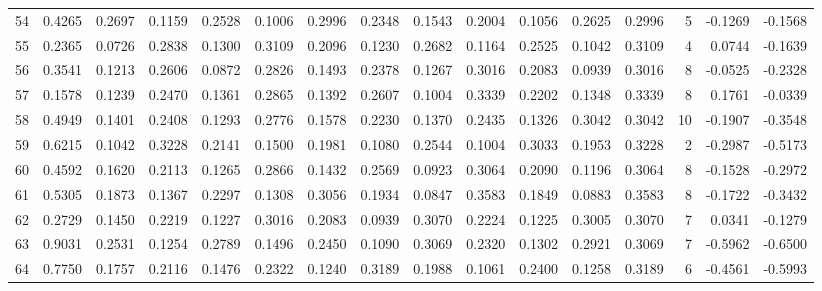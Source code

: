 \begin{tabular}{lrrrrrrrrrrrrrrr}
54  &      0.4265 &  0.2697 &  0.1159 &  0.2528 &  0.1006 &  0.2996 &  0.2348 &  0.1543 &  0.2004 &  0.1056 &   0.2625 &     0.2996 &      5 &                   -0.1269 &                    -0.1568 \\
55  &      0.2365 &  0.0726 &  0.2838 &  0.1300 &  0.3109 &  0.2096 &  0.1230 &  0.2682 &  0.1164 &  0.2525 &   0.1042 &     0.3109 &      4 &                    0.0744 &                    -0.1639 \\
56  &      0.3541 &  0.1213 &  0.2606 &  0.0872 &  0.2826 &  0.1493 &  0.2378 &  0.1267 &  0.3016 &  0.2083 &   0.0939 &     0.3016 &      8 &                   -0.0525 &                    -0.2328 \\
57  &      0.1578 &  0.1239 &  0.2470 &  0.1361 &  0.2865 &  0.1392 &  0.2607 &  0.1004 &  0.3339 &  0.2202 &   0.1348 &     0.3339 &      8 &                    0.1761 &                    -0.0339 \\
58  &      0.4949 &  0.1401 &  0.2408 &  0.1293 &  0.2776 &  0.1578 &  0.2230 &  0.1370 &  0.2435 &  0.1326 &   0.3042 &     0.3042 &     10 &                   -0.1907 &                    -0.3548 \\
59  &      0.6215 &  0.1042 &  0.3228 &  0.2141 &  0.1500 &  0.1981 &  0.1080 &  0.2544 &  0.1004 &  0.3033 &   0.1953 &     0.3228 &      2 &                   -0.2987 &                    -0.5173 \\
60  &      0.4592 &  0.1620 &  0.2113 &  0.1265 &  0.2866 &  0.1432 &  0.2569 &  0.0923 &  0.3064 &  0.2090 &   0.1196 &     0.3064 &      8 &                   -0.1528 &                    -0.2972 \\
61  &      0.5305 &  0.1873 &  0.1367 &  0.2297 &  0.1308 &  0.3056 &  0.1934 &  0.0847 &  0.3583 &  0.1849 &   0.0883 &     0.3583 &      8 &                   -0.1722 &                    -0.3432 \\
62  &      0.2729 &  0.1450 &  0.2219 &  0.1227 &  0.3016 &  0.2083 &  0.0939 &  0.3070 &  0.2224 &  0.1225 &   0.3005 &     0.3070 &      7 &                    0.0341 &                    -0.1279 \\
63  &      0.9031 &  0.2531 &  0.1254 &  0.2789 &  0.1496 &  0.2450 &  0.1090 &  0.3069 &  0.2320 &  0.1302 &   0.2921 &     0.3069 &      7 &                   -0.5962 &                    -0.6500 \\
64  &      0.7750 &  0.1757 &  0.2116 &  0.1476 &  0.2322 &  0.1240 &  0.3189 &  0.1988 &  0.1061 &  0.2400 &   0.1258 &     0.3189 &      6 &                   -0.4561 &                    -0.5993 \\

\end{tabular}
